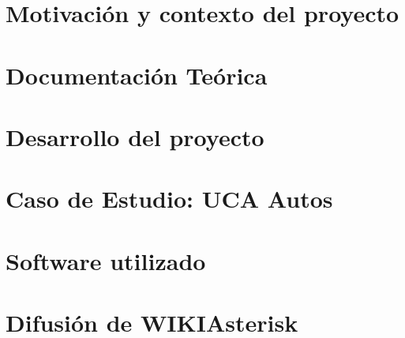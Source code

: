 \documentclass[a4paper,11pt]{book}
\begin{document}
\renewcommand{\listfigurename}{Indice de figuras}
\renewcommand{\tablename}{Tabla}
\renewcommand{\listtablename}{Indice de tablas}


\pagestyle{empty}

\cleardoublepage


\cleardoublepage
\pagestyle{plain}

\frontmatter %


\cleardoublepage

\tableofcontents
\listoffigures
\listoftables

\mainmatter %

\chapter{Motivación y contexto del proyecto}

\chapter{Documentación Teórica}


\chapter{Desarrollo del proyecto}


\chapter{Caso de Estudio: UCA Autos}




\backmatter %

\clearpage

\chapter*{Software utilizado}


\chapter*{Difusión de WIKIAsterisk}\label{cap:difusion}




\nocite{atdg11}
\nocite{website:voipinfo}
\nocite{website:asterisk}
\nocite{win09}


\end{document}
